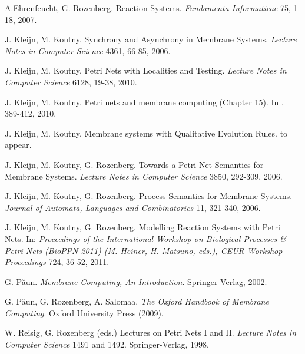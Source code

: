 \documentclass{mecbic}
\begin{document}
 \begin{thebibliography}{1}

\bibitem{} A.Ehrenfeucht, G. Rozenberg. Reaction Systems. {\it Fundamenta Informaticae} 75, 
1-18, 2007.

\bibitem{}J. Kleijn, M. Koutny. Synchrony and Asynchrony in Membrane Systems. {\it Lecture
Notes in Computer Science}  4361, 66-85, 2006.

\bibitem{}J. Kleijn, M. Koutny. Petri Nets with Localities and Testing. {\it Lecture Notes in
Computer Science} 6128, 19-38, 2010.

\bibitem{}J. Kleijn, M. Koutny. Petri nets and membrane computing (Chapter 15). In \cite{hand}, 389-412, 2010.

\bibitem{}J. Kleijn, M. Koutny. Membrane systems with Qualitative Evolution Rules.
to appear.

\bibitem{}J. Kleijn, M. Koutny, G. Rozenberg. Towards a Petri Net Semantics for Membrane
Systems.  {\it Lecture Notes in Computer Science} 3850, 292-309, 2006.

\bibitem{}J. Kleijn, M. Koutny, G. Rozenberg. Process Semantics for Membrane Systems.
 {\it Journal of Automata, Languages and Combinatorics} 11, 321-340, 2006.

\bibitem{}J. Kleijn, M. Koutny, G. Rozenberg. Modelling Reaction Systems with Petri
Nets. In:  {\it Proceedings of the International Workshop on Biological Processes
\& Petri Nets (BioPPN-2011) (M. Heiner, H. Matsuno, eds.), CEUR Workshop
Proceedings} 724, 36-52, 2011.

\bibitem{}G. P\u aun.  {\it Membrane Computing, An Introduction}. Springer-Verlag, 2002.

G. P\u aun, G. Rozenberg, A. Salomaa.  {\it The Oxford Handbook of Membrane Computing}.
Oxford University Press (2009).

\bibitem{}W. Reisig, G. Rozenberg (eds.) Lectures on Petri Nets I and II.  {\it Lecture Notes
in Computer Science} 1491 and 1492. Springer-Verlag, 1998.



\end{thebibliography}
\end{document}
